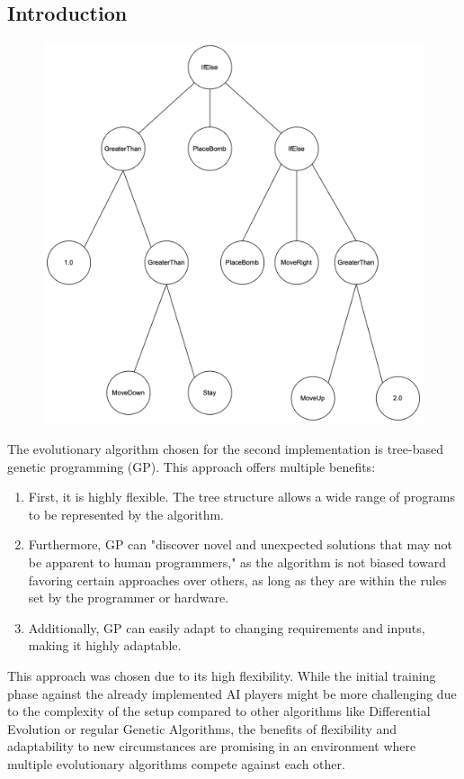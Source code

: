 \documentclass[sigconf]{acmart} %
\begin{document}
\subsection{Introduction}
\begin{figure}
	\centering
	\includegraphics[width=0.7\linewidth]{pictures/treeWithDepthOfThree}
	\caption{}
	\label{fig:treewithdepthofthree}
\end{figure}

The evolutionary algorithm chosen for the second implementation is tree-based genetic programming (GP). This approach offers multiple benefits: 

\begin{enumerate}
	\item First, it is highly flexible. The tree structure allows a wide range of programs to be represented by the algorithm. 
 	\item Furthermore, GP can \cite{TreeBasedGPWeb}"discover novel and unexpected solutions that may not be apparent to human programmers,"  as the algorithm is not biased toward favoring certain approaches over others, as long as they are within the rules set by the programmer or hardware.
  	\item Additionally, GP can easily adapt to changing requirements and inputs, making it highly adaptable.
  \end{enumerate}
This approach was chosen due to its high flexibility. While the initial training phase against the already implemented AI players might be more challenging due to the complexity of the setup compared to other algorithms like Differential Evolution or regular Genetic Algorithms, the benefits of flexibility and adaptability to new circumstances are promising in an environment where multiple evolutionary algorithms compete against each other. 
\end{document}
